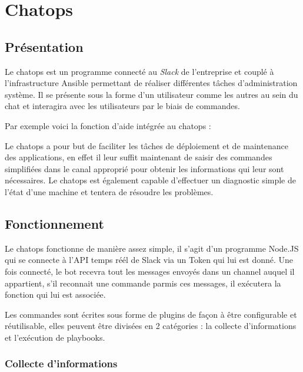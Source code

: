 \newpage

\section{Chatops}\label{chatops}

\subsection{Présentation}\label{pruxe9sentation-1}

Le chatops est un programme connecté au \emph{Slack} de l'entreprise et
couplé à l'infrastructure Ansible permettant de réaliser différentes
tâches d'administration système. Il se présente sous la forme d'un
utilisateur comme les autres au sein du chat et interagira avec les
utilisateurs par le biais de commandes.

\bigskip

Par exemple voici la fonction d'aide intégrée au chatops :

\bigskip

Le chatops a pour but de faciliter les tâches de déploiement et de
maintenance des applications, en effet il leur suffit maintenant de
saisir des commandes simplifiées dans le canal approprié pour obtenir
les informations qui leur sont nécessaires. Le chatops est également
capable d'effectuer un diagnostic simple de l'état d'une machine et
tentera de résoudre les problèmes.

\newpage

\subsection{Fonctionnement}\label{fonctionnement}

Le chatops fonctionne de manière assez simple, il s'agit d'un programme
Node.JS qui se connecte à l'API temps réél de Slack via un Token qui lui
est donné. Une fois connecté, le bot recevra tout les messages envoyés
dans un channel auquel il appartient, s'il reconnait une commande parmis
ces messages, il exécutera la fonction qui lui est associée.

\bigskip

Les commandes sont écrites sous forme de plugins de façon à être
configurable et réutilisable, elles peuvent être divisées en 2
catégories : la collecte d'informations et l'exécution de playbooks.

\newpage

\subsubsection{Collecte d'informations}\label{collecte-dinformations}


